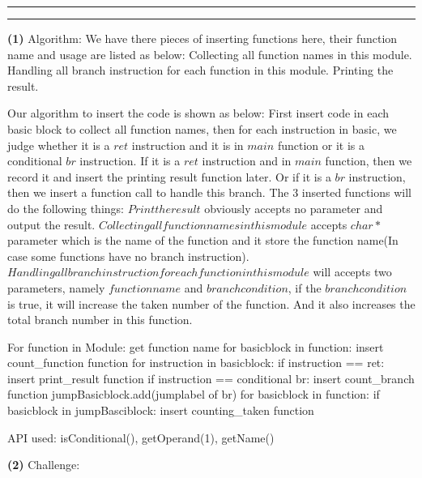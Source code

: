 \documentclass[11pt]{article}
\newcommand{\question}[2] {\vspace{.25in} \hrule\vspace{0.5em}
\noindent{\bf #1: #2} \vspace{0.5em}
\hrule \vspace{.10in}}
\renewcommand{\part}[1] {\vspace{.10in} {\bf (#1)}}
\begin{document}
\question{3}{Profiling Branch Bias}

\part{1} Algorithm:
We have there pieces of inserting functions here, their function name and usage are listed as below:
Collecting all function names in this module.
Handling all branch instruction for each function in this module.
Printing the result.

Our algorithm to insert the code is shown as below: First insert code in each basic block to collect all function names, then for each instruction in basic, we judge whether it is a $ret$ instruction and it is in $main$ function or it is a conditional $br$ instruction. If it is a $ret$ instruction and in $main$ function, then we record it and insert the printing result function later. Or if it is a $br$ instruction, then we insert a function call to handle this branch. The 3 inserted functions will do the following things: $Print the result$ obviously accepts no parameter and output the result. $Collecting all function names in this module$ accepts $char *$ parameter which is the name of the function and it store the function name(In case some functions have no branch instruction). $Handling all branch instruction for each function in this module$ will accepts two parameters, namely $function name$ and $branch condition$, if the $branch condition$ is true, it will increase the taken number of the function. And it also increases the total branch number in this function.

For function in Module:	get function name
	for basicblock in function:
		insert count_function function
		for instruction in basicblock:
			if instruction == ret:
				insert print_result function
			if instruction == conditional br:
				insert count_branch function
				jumpBasicblock.add(jumplabel of br)
	for basicblock in function:
		if basicblock in  jumpBasciblock:
			insert counting_taken function

API used:
isConditional(),
getOperand(1),
getName()


\part{2} Challenge:
\end{document}
